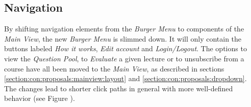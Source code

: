 \subsection{Navigation}
By shifting navigation elements from the \emph{Burger Menu} to components of the \emph{Main View}, the new \emph{Burger Menu} is slimmed down.
It will only contain the buttons labeled \emph{How it works}, \emph{Edit account} and \emph{Login/Logout}. The options to view the \emph{Question Pool}, to \emph{Evaluate} a given lecture or to unsubscribe from a course have all been moved to the \emph{Main View}, as described in sections \ref{section:con:proposals:mainview:layout} and \ref{section:con:proposals:dropdown}.
The changes lead to shorter click paths in general with more well-defined behavior (see Figure \todogrf).


